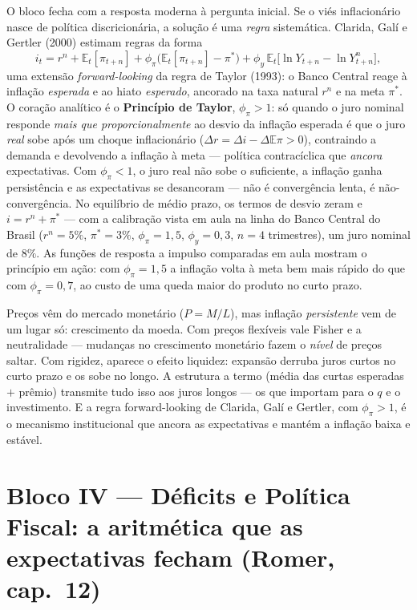 \documentclass[12pt, a4paper]{article}
\newcommand{\E}{\mathbb{E}}
\begin{document}
O bloco fecha com a resposta moderna à pergunta inicial. Se o viés
inflacionário nasce de política discricionária, a solução é uma \emph{regra}
sistemática. Clarida, Galí e Gertler (2000) estimam regras da forma
\[
i_t = r^n + \E_t[\pi_{t+n}]
+ \phi_\pi\bigl(\E_t[\pi_{t+n}] - \pi^*\bigr)
+ \phi_y\,\E_t\bigl[\ln Y_{t+n} - \ln Y^n_{t+n}\bigr],
\]
uma extensão \emph{forward-looking} da regra de Taylor (1993): o Banco Central
reage à inflação \emph{esperada} e ao hiato \emph{esperado}, ancorado na taxa
natural $r^n$ e na meta $\pi^*$. O coração analítico é o \textbf{Princípio de
Taylor}, $\phi_\pi > 1$: só quando o juro nominal responde \emph{mais que
proporcionalmente} ao desvio da inflação esperada é que o juro \emph{real}
sobe após um choque inflacionário ($\Delta r = \Delta i - \Delta\E\pi > 0$),
contraindo a demanda e devolvendo a inflação à meta --- política
contracíclica que \emph{ancora} expectativas. Com $\phi_\pi < 1$, o juro real
não sobe o suficiente, a inflação ganha persistência e as expectativas se
desancoram --- não é convergência lenta, é não-convergência. No equilíbrio de
médio prazo, os termos de desvio zeram e $i = r^n + \pi^*$ --- com a
calibração vista em aula na linha do Banco Central do Brasil ($r^n = 5\%$,
$\pi^* = 3\%$, $\phi_\pi = 1{,}5$, $\phi_y = 0{,}3$, $n = 4$ trimestres), um
juro nominal de $8\%$. As funções de resposta a impulso comparadas em aula
mostram o princípio em ação: com $\phi_\pi = 1{,}5$ a inflação volta à meta
bem mais rápido do que com $\phi_\pi = 0{,}7$, ao custo de uma queda maior do
produto no curto prazo.

\begin{sintesebox}[title={Síntese do Bloco III --- a história em cinco frases}]
Preços vêm do mercado monetário ($P = M/L$), mas inflação \emph{persistente}
vem de um lugar só: crescimento da moeda. Com preços flexíveis vale Fisher e a
neutralidade --- mudanças no crescimento monetário fazem o \emph{nível} de
preços saltar. Com rigidez, aparece o efeito liquidez: expansão derruba juros
curtos no curto prazo e os sobe no longo. A estrutura a termo (média das
curtas esperadas $+$ prêmio) transmite tudo isso aos juros longos --- os que
importam para o $q$ e o investimento. E a regra forward-looking de Clarida,
Galí e Gertler, com $\phi_\pi > 1$, é o mecanismo institucional que ancora as
expectativas e mantém a inflação baixa e estável.
\end{sintesebox}

\section{Bloco IV --- Déficits e Política Fiscal: a aritmética que as expectativas fecham (Romer, cap.\ 12)}
\end{document}
